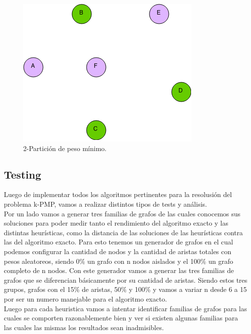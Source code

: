 \begin{figure}[H]
\begin{center}
\includegraphics[scale=0.6]{finales/kpmp2.png}
\caption{2-Partici\'on de peso m\'inimo.}
\end{center}
\end{figure}


\subsection{Testing}

Luego de implementar todos los algoritmos pertinentes para la resolusión del problema k-PMP, vamos a realizar distintos tipos de tests y análisis.\\

Por un lado vamos a generar tres familias de grafos de las cuales conocemos sus soluciones para poder medir tanto el rendimiento del algoritmo exacto y las distintas heurísticas, como la distancia de las soluciones de las heurísticas contra las del algoritmo exacto. Para esto tenemos un generador de grafos en el cual podemos configurar la cantidad de nodos y la cantidad de aristas totales con pesos aleatoreos, siendo 0\% un grafo con n nodos aislados y el 100\% un grafo completo de n nodos. Con este generador vamos a generar las tres familias de grafos que se diferencian básicamente por su cantidad de aristas. Siendo estos tres grupos, grafos con el 15\% de aristas, 50\% y 100\% y vamos a variar n desde 6 a 15 por ser un numero manejable para el algoritmo exacto.\\

Luego para cada heuristica vamos a intentar identificar familias de grafos para las cuales se comporten razonablemente bien y ver si existen algunas familias para las cuales las mismas los resultados sean inadmisibles.